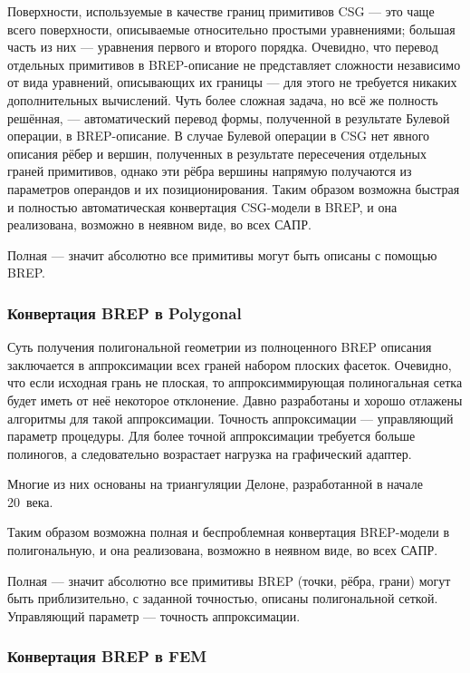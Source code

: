 Поверхности, используемые в качестве границ примитивов CSG --- это чаще всего поверхности, описываемые относительно простыми уравнениями; большая часть из них --- уравнения первого и второго порядка. Очевидно, что перевод отдельных примитивов в BREP-описание не представляет сложности независимо от вида уравнений, описывающих их границы --- для этого не требуется никаких дополнительных вычислений. Чуть более сложная задача, но всё же полность решённая, --- автоматический перевод формы, полученной в результате Булевой операции, в BREP-описание. В случае Булевой операции в CSG нет явного описания рёбер и вершин, полученных в результате пересечения отдельных граней примитивов, однако эти рёбра вершины напрямую получаются из параметров операндов и их позиционирования. Таким образом возможна быстрая и полностью автоматическая конвертация CSG-модели в BREP, и она реализована, возможно в неявном виде, во всех САПР.

Полная --- значит абсолютно все примитивы могут быть описаны с помощью BREP.

\subsubsection{Конвертация BREP в Polygonal}\label{sec:secBREPtoPolygonal}

Суть получения полигональной геометрии из полноценного BREP описания заключается в аппроксимации всех граней набором плоских фасеток. Очевидно, что если исходная грань не плоская, то аппроксиммирующая полиногальная сетка будет иметь от неё некоторое отклонение.
Давно разработаны и хорошо отлажены алгоритмы для такой аппроксимации. Точность аппроксимации --- управляющий параметр процедуры. Для более точной аппроксимации требуется больше полиногов, а следовательно возрастает нагрузка на графический адаптер.

Многие из них основаны на триангуляции Делоне, разработанной в начале 20~века.

Таким образом возможна полная и \todo беспроблемная \todo конвертация BREP-модели в полигональную, и она реализована, возможно в неявном виде, во всех САПР.

Полная --- значит абсолютно все примитивы BREP (точки, рёбра, грани) могут быть приблизительно, с заданной точностью, описаны полигональной сеткой. Управляющий параметр --- точность аппроксимации.

\subsubsection{Конвертация BREP в FEM}\label{sec:secBREPtoFEM}

